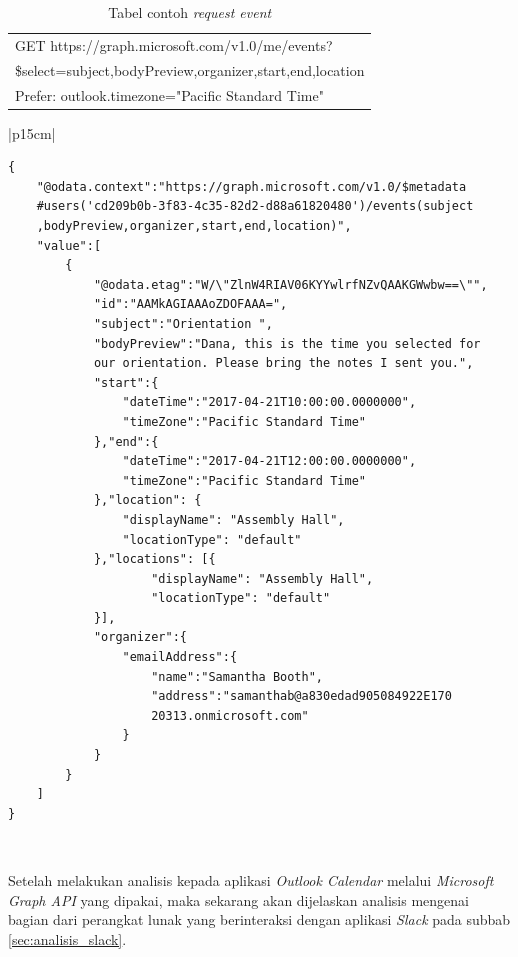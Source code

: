 \begin{table}[H]
	\centering 
	\caption{Tabel contoh \textit{request event}}
	\label{tab:contoh_request_event}
	\begin{tabular}{|p{12cm}|}
	\toprule
	GET https://graph.microsoft.com/v1.0/me/events?\\
	\$select=subject,bodyPreview,organizer,start,end,location\\
	Prefer: outlook.timezone="Pacific Standard Time"\\
	\bottomrule
	\end{tabular}  
\end{table}

\begin{table}[H]
	\centering 
	\caption{Tabel contoh \textit{response event}}
	\label{tab:contoh_response_event}
	\begin{tabular}{|p{15cm}|}
	\toprule
	\begin{lstlisting}
{
    "@odata.context":"https://graph.microsoft.com/v1.0/$metadata
    #users('cd209b0b-3f83-4c35-82d2-d88a61820480')/events(subject
    ,bodyPreview,organizer,start,end,location)",
    "value":[
        {
            "@odata.etag":"W/\"ZlnW4RIAV06KYYwlrfNZvQAAKGWwbw==\"",
            "id":"AAMkAGIAAAoZDOFAAA=",
            "subject":"Orientation ",
            "bodyPreview":"Dana, this is the time you selected for 
            our orientation. Please bring the notes I sent you.",
            "start":{
                "dateTime":"2017-04-21T10:00:00.0000000",
                "timeZone":"Pacific Standard Time"
            },"end":{
                "dateTime":"2017-04-21T12:00:00.0000000",
                "timeZone":"Pacific Standard Time"
            },"location": {
                "displayName": "Assembly Hall",
                "locationType": "default"
            },"locations": [{
                    "displayName": "Assembly Hall",
                    "locationType": "default"
            }],                
            "organizer":{
                "emailAddress":{
                    "name":"Samantha Booth",
                    "address":"samanthab@a830edad905084922E170
                    20313.onmicrosoft.com"
                }
            }
        }
    ]
}
\end{lstlisting}\\
	\bottomrule
	\end{tabular}  
\end{table}

Setelah melakukan analisis kepada aplikasi \textit{Outlook Calendar} melalui \textit{Microsoft Graph API} yang dipakai, maka sekarang akan dijelaskan analisis mengenai bagian dari perangkat lunak yang berinteraksi dengan aplikasi \textit{Slack} pada subbab \ref{sec:analisis_slack}.

